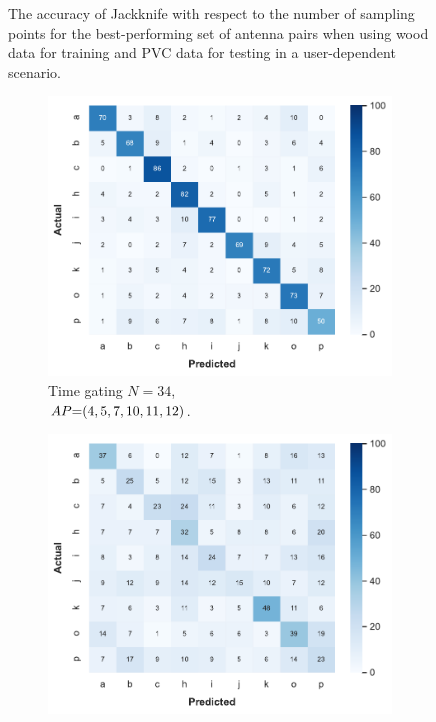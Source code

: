 \begin{figure}[t]
    \caption{The accuracy of Jackknife with respect to the number of sampling points for the best-performing set of antenna pairs when using wood data for training and PVC data for testing in a user-dependent scenario.}
    \label{fig:radar-experiments:through-materials:wood-pvc-samples}
\end{figure}

\begin{figure}[ht]
    \begin{subfigure}{.49\textwidth}
        \centering
        \includegraphics[width=.99\linewidth]{Figures/RadarExperiments/Datasets/ThroughMaterials/Wood+PVC/confusion-timegating-ud.pdf}
        \vspace{-15pt}
        \captionsetup{width=.99\linewidth}
        \caption{Time gating $N{=}34$, \\ $\splitatcommas{AP{=}(4, 5, 7, 10, 11, 12)}$.}
        \label{fig:radar-experiments:through-materials:wood-pvc-confusion:timegating-ud}
    \end{subfigure}
    \begin{subfigure}{.49\textwidth}
        \centering
        \includegraphics[width=.99\linewidth]{Figures/RadarExperiments/Datasets/ThroughMaterials/Wood+PVC/confusion-filtering-ud.pdf}

\end{subfigure}
\end{figure}
